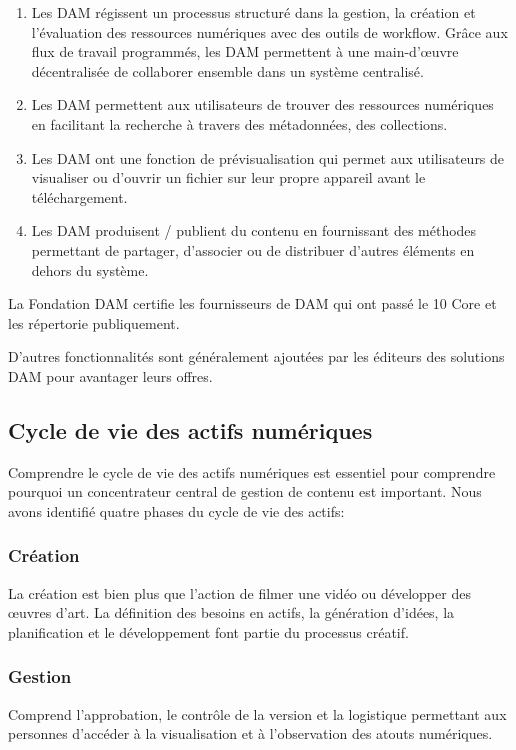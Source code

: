 \begin{enumerate}
\item Les DAM régissent un processus structuré dans la gestion, la création et l'évaluation des ressources numériques avec des outils de workflow. Grâce aux flux de travail programmés, les DAM permettent à une main-d'œuvre décentralisée de collaborer ensemble dans un système centralisé.
\newline


\item Les DAM permettent aux utilisateurs de trouver des ressources numériques en facilitant la recherche à travers des métadonnées, des collections.
 \newline


\item Les DAM ont une fonction de prévisualisation qui permet aux utilisateurs de visualiser ou d'ouvrir un fichier sur leur propre appareil avant le téléchargement.
\newline


\item Les DAM produisent / publient du contenu en fournissant des méthodes permettant de partager, d'associer ou de distribuer d'autres éléments en dehors du système. 
 \newline
\end{enumerate}

 
 La Fondation DAM certifie les fournisseurs de DAM qui ont passé le 10 Core et les répertorie publiquement.

D’autres fonctionnalités sont généralement ajoutées par les éditeurs des solutions DAM pour avantager leurs offres.
\subsection{Cycle de vie des actifs numériques}
Comprendre le cycle de vie des actifs numériques est essentiel pour comprendre pourquoi un concentrateur central de gestion de contenu est important. Nous avons identifié quatre phases du cycle de vie des actifs:

\subsubsection{Création}{}La création est bien plus que l'action de filmer une vidéo ou développer des œuvres d'art. La définition des besoins en actifs, la génération d'idées, la planification et le développement font partie du processus créatif.
\subsubsection{Gestion }{}Comprend l'approbation, le contrôle de la version et la logistique permettant aux personnes d'accéder à la visualisation et à l'observation des atouts numériques.
